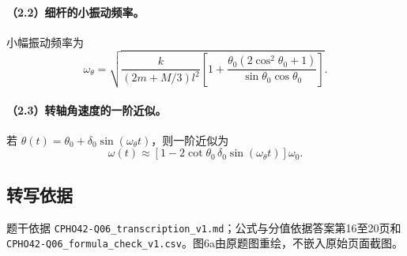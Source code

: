 \paragraph{（2.2）细杆的小振动频率。}
小幅振动频率为
\[\omega_\theta=\sqrt{\frac{k}{(2m+M/3)l^2}\left[1+\frac{\theta_0(2\cos^2\theta_0+1)}{\sin\theta_0\cos\theta_0}\right]}.\]
\paragraph{（2.3）转轴角速度的一阶近似。}
若 $\theta(t)=\theta_0+\delta_0\sin(\omega_\theta t)$，则一阶近似为
\[\omega(t)\approx\left[1-2\cot\theta_0\,\delta_0\sin(\omega_\theta t)\right]\omega_0.\]
\subsection{转写依据}
题干依据 \texttt{CPHO42-Q06\_transcription\_v1.md}；公式与分值依据答案第16至20页和 \texttt{CPHO42-Q06\_formula\_check\_v1.csv}。图6a由原题图重绘，不嵌入原始页面截图。
